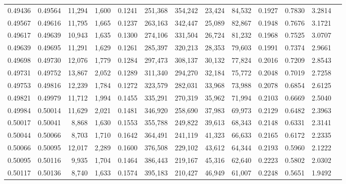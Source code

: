 \begin{tabular}{rrrrrrrrrrrrr}
0.49436 & 0.49564 & 11,294 & 1,600 &                                     0.1241 & 251,368 & 354,242 &  23,424 &  84,532 & 0.1927 & 0.7830 & 3.2814 \\
0.49567 & 0.49616 & 11,795 & 1,665 &                                     0.1237 & 263,163 & 342,447 &  25,089 &  82,867 & 0.1948 & 0.7676 & 3.1721 \\
0.49617 & 0.49639 & 10,943 & 1,635 &                                     0.1300 & 274,106 & 331,504 &  26,724 &  81,232 & 0.1968 & 0.7525 & 3.0707 \\
0.49639 & 0.49695 & 11,291 & 1,629 &                                     0.1261 & 285,397 & 320,213 &  28,353 &  79,603 & 0.1991 & 0.7374 & 2.9661 \\
0.49698 & 0.49730 & 12,076 & 1,779 &                                     0.1284 & 297,473 & 308,137 &  30,132 &  77,824 & 0.2016 & 0.7209 & 2.8543 \\
0.49731 & 0.49752 & 13,867 & 2,052 &                                     0.1289 & 311,340 & 294,270 &  32,184 &  75,772 & 0.2048 & 0.7019 & 2.7258 \\
0.49753 & 0.49816 & 12,239 & 1,784 &                                     0.1272 & 323,579 & 282,031 &  33,968 &  73,988 & 0.2078 & 0.6854 & 2.6125 \\
0.49821 & 0.49979 & 11,712 & 1,994 &                                     0.1455 & 335,291 & 270,319 &  35,962 &  71,994 & 0.2103 & 0.6669 & 2.5040 \\
0.49984 & 0.50014 & 11,629 & 2,021 &                                     0.1481 & 346,920 & 258,690 &  37,983 &  69,973 & 0.2129 & 0.6482 & 2.3963 \\
0.50017 & 0.50041 &  8,868 & 1,630 &                                     0.1553 & 355,788 & 249,822 &  39,613 &  68,343 & 0.2148 & 0.6331 & 2.3141 \\
0.50044 & 0.50066 &  8,703 & 1,710 &                                     0.1642 & 364,491 & 241,119 &  41,323 &  66,633 & 0.2165 & 0.6172 & 2.2335 \\
0.50066 & 0.50095 & 12,017 & 2,289 &                                     0.1600 & 376,508 & 229,102 &  43,612 &  64,344 & 0.2193 & 0.5960 & 2.1222 \\
0.50095 & 0.50116 &  9,935 & 1,704 &                                     0.1464 & 386,443 & 219,167 &  45,316 &  62,640 & 0.2223 & 0.5802 & 2.0302 \\
0.50117 & 0.50136 &  8,740 & 1,633 &                                     0.1574 & 395,183 & 210,427 &  46,949 &  61,007 & 0.2248 & 0.5651 & 1.9492 \\

\end{tabular}
